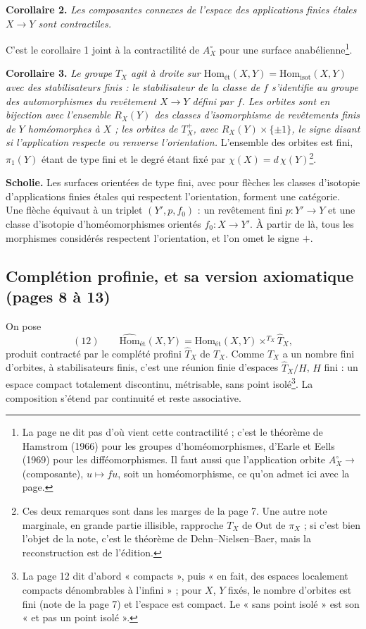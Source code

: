 \documentclass[11pt,a4paper]{article}
\begin{document}
\textbf{Corollaire 2.} \emph{Les composantes connexes de l'espace des
applications finies étales $X \to Y$ sont contractiles.}

C'est le corollaire 1 joint à la contractilité de $A^{\circ}_X$ pour une
surface anabélienne\footnote{La page ne dit pas d'où vient cette
contractilité ; c'est le théorème de Hamstrom (1966) pour les groupes
d'homéomorphismes, d'Earle et Eells (1969) pour les difféomorphismes. Il faut
aussi que l'application orbite $A^{\circ}_X \to$ (composante), $u \mapsto f u$,
soit un homéomorphisme, ce qu'on admet ici avec la page.}.

\textbf{Corollaire 3.} \emph{Le groupe $T_X$ agit à droite sur
$\mathrm{Hom}_{\mathrm{ét}}(X, Y) = \mathrm{Hom}_{\mathrm{isot}}(X, Y)$ avec des
stabilisateurs finis : le stabilisateur de la classe de $f$ s'identifie au
groupe des automorphismes du revêtement $X \to Y$ défini par $f$. Les orbites
sont en bijection avec l'ensemble $R_X(Y)$ des classes d'isomorphisme de
revêtements finis de $Y$ homéomorphes à $X$ ; les orbites de $T^{+}_X$, avec
$R_X(Y) \times \{\pm 1\}$, le signe disant si l'application respecte ou
renverse l'orientation.} L'ensemble des orbites est fini, $\pi_1(Y)$ étant de
type fini et le degré étant fixé par $\chi(X) = d\,\chi(Y)$\footnote{Ces deux
remarques sont dans les marges de la page 7. Une autre note marginale, en
grande partie illisible, rapproche $T_X$ de $\mathrm{Out}$ de $\pi_X$ ; si
c'est bien l'objet de la note, c'est le théorème de Dehn–Nielsen–Baer, mais
la reconstruction est de l'édition.}.

\textbf{Scholie.} Les surfaces orientées de type fini, avec pour flèches les
classes d'isotopie d'applications finies étales qui respectent l'orientation,
forment une catégorie. Une flèche équivaut à un triplet $(Y', p, f_0)$ : un
revêtement fini $p : Y' \to Y$ et une classe d'isotopie d'homéomorphismes
orientés $f_0 : X \to Y'$. À partir de là, tous les morphismes considérés
respectent l'orientation, et l'on omet le signe $+$.

\subsection*{Complétion profinie, et sa version axiomatique (pages 8 à 13)}

On pose
\[
(12)\qquad \widehat{\mathrm{Hom}}_{\mathrm{ét}}(X, Y) = \mathrm{Hom}_{\mathrm{ét}}(X, Y) \times^{T_X} \widehat{T}_X ,
\]
produit contracté par le complété profini $\widehat{T}_X$ de $T_X$. Comme
$T_X$ a un nombre fini d'orbites, à stabilisateurs finis, c'est une réunion
finie d'espaces $\widehat{T}_X/H$, $H$ fini : un espace compact totalement
discontinu, métrisable, sans point isolé\footnote{La page 12 dit d'abord
« compacts », puis « en fait, des espaces localement compacts dénombrables à
l'infini » ; pour $X$, $Y$ fixés, le nombre d'orbites est fini (note de la
page 7) et l'espace est compact. Le « sans point isolé » est son « et pas un
point isolé ».}. La composition s'étend par continuité et reste associative.
\end{document}

